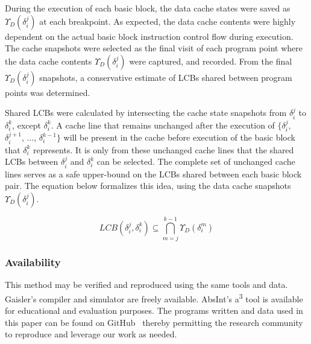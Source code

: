 During the execution of each basic block, the data cache states were saved as ${\Upsilon_D(\delta_i^j)}$ at each breakpoint. As expected, the data cache contents were highly dependent on the actual basic block instruction control flow during execution.  The cache snapshots were selected as the final visit of each program point where the data cache contents ${\Upsilon_D(\delta_i^j)}$ were captured, and recorded. From the final ${\Upsilon_D(\delta_i^j)}$ snapshots, a conservative estimate of LCBs shared between program points was determined.
%

Shared LCBs were calculated by intersecting the cache state snapshots from ${\delta_i^j}$
to ${\delta_i^k}$, except ${\delta_i^k}$. A cache line that remains unchanged after
the execution of $\{{\delta_i^j}$, ${\delta_i^{j+1}}$, ..., ${\delta_i^{k-1}}\}$ will be present in the cache before execution of the basic block that ${\delta_i^k}$ represents. It is only from these unchanged cache lines that the shared LCBs between ${\delta_i^j}$ and ${\delta_i^k}$ can be selected. The complete set of
unchanged cache lines serves as a safe upper-bound on the LCBs shared between each basic block pair. The equation below formalizes this idea, using the data cache snapshots ${\Upsilon_D(\delta_i^j)}$.
\vspace{-20pt}
\begin{center}
  \begin{equation}
    LCB(\delta_i^j,\delta_i^k) \subseteq \bigcap_{m=j}^{k-1} {\Upsilon_D(\delta_i^m)}
  \end{equation}
\end{center}
\subsubsection{Availability}
This method may be verified and reproduced using the same tools and data. Gaisler's compiler and simulator are freely available. AbsInt's a\textsuperscript{3} tool is available for educational and evaluation purposes. The programs written and data used in this paper can be found on GitHub~\cite{tessler:14} thereby permitting the research community to reproduce and leverage our work as needed.
\newline

